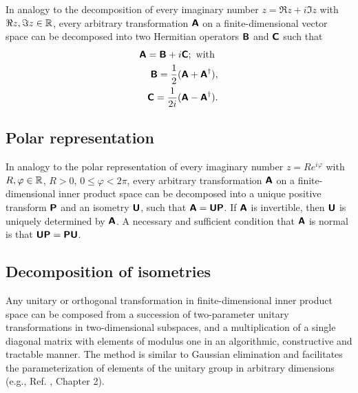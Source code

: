 In analogy to the decomposition of every imaginary number $z= \Re z +i \Im z$ with $\Re z,\Im z\in {\Bbb R}$,
every arbitrary transformation $\textsf{\textbf{A}}$ on a finite-dimensional vector space can be decomposed into two Hermitian operators
$\textsf{\textbf{B}}$
and
$\textsf{\textbf{C}}$
such that
\begin{equation}
\begin{split}
\textsf{\textbf{A}}=\textsf{\textbf{B}} + i \textsf{\textbf{C}}; \textrm{ with }  \\
\textsf{\textbf{B}}=\frac{1}{2}(\textsf{\textbf{A}} +   \textsf{\textbf{A}}^\dagger ), \\
\textsf{\textbf{C}}=\frac{1}{2i}(\textsf{\textbf{A}} -   \textsf{\textbf{A}}^\dagger ).
\end{split}
\end{equation}




\subsection{Polar representation}

In analogy to the polar representation of every imaginary number $z= R e^{i\varphi}$ with $R,\varphi \in {\Bbb R}$, $R>0$,
$0\le \varphi < 2\pi$,
every arbitrary transformation $\textsf{\textbf{A}}$ on a finite-dimensional inner product space can be decomposed into
a unique positive transform
$\textsf{\textbf{P}}$ and an isometry
$\textsf{\textbf{U}}$, such that $\textsf{\textbf{A}}= \textsf{\textbf{U}} \textsf{\textbf{P}}$.
If $\textsf{\textbf{A}}$ is invertible, then $\textsf{\textbf{U}}$  is uniquely determined by
$\textsf{\textbf{A}}$.
A necessary and sufficient condition that $\textsf{\textbf{A}}$ is normal is that
$\textsf{\textbf{U}} \textsf{\textbf{P}}=\textsf{\textbf{P}} \textsf{\textbf{U}} $.

\subsection{Decomposition of isometries}

Any unitary or orthogonal transformation   in finite-dimensional inner product space
can be composed from a succession of two-parameter unitary transformations in
two-dimensional subspaces,
and a multiplication of a single diagonal matrix with elements of modulus one
in an algorithmic, constructive and tractable manner.
The method is similar to Gaussian elimination and facilitates the parameterization of elements
of the unitary group  in arbitrary dimensions (e.g., Ref. \cite{murnaghan}, Chapter 2).

